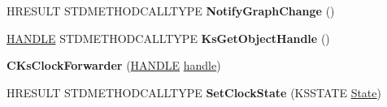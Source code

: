 \begin{DoxyCompactItemize}
H\+R\+E\+S\+U\+LT S\+T\+D\+M\+E\+T\+H\+O\+D\+C\+A\+L\+L\+T\+Y\+PE {\bfseries Notify\+Graph\+Change} ()
\item 
\mbox{\label{class_c_ks_clock_forwarder_a217e853f151434d27aeb53b0c5b2f081}} 
\hyperlink{interfacevoid}{H\+A\+N\+D\+LE} S\+T\+D\+M\+E\+T\+H\+O\+D\+C\+A\+L\+L\+T\+Y\+PE {\bfseries Ks\+Get\+Object\+Handle} ()
\item 
\mbox{\label{class_c_ks_clock_forwarder_a0ae9fc06bb71af567ed4c27493a44f7f}} 
{\bfseries C\+Ks\+Clock\+Forwarder} (\hyperlink{interfacevoid}{H\+A\+N\+D\+LE} \hyperlink{structhandle}{handle})
\item 
\mbox{\label{class_c_ks_clock_forwarder_a994adb1fd461a426acf5f634414ea2bc}} 
H\+R\+E\+S\+U\+LT S\+T\+D\+M\+E\+T\+H\+O\+D\+C\+A\+L\+L\+T\+Y\+PE {\bfseries Set\+Clock\+State} (K\+S\+S\+T\+A\+TE \hyperlink{struct_state}{State})
\end{DoxyCompactItemize}
